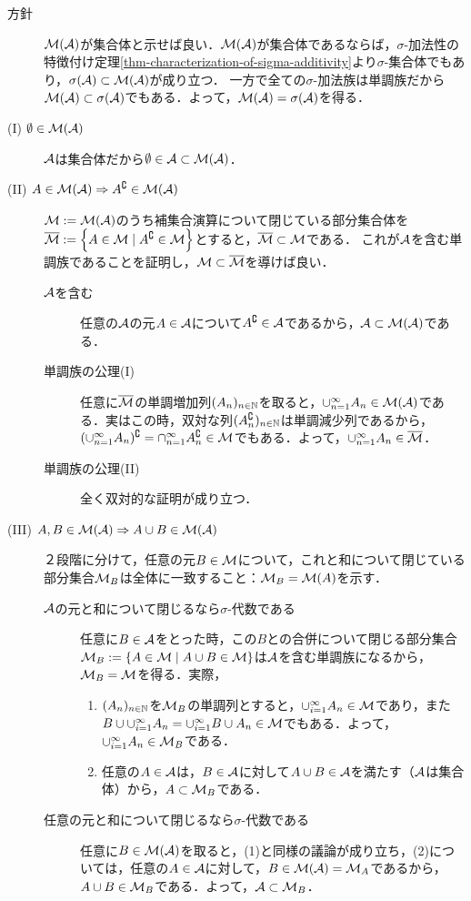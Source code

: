 \documentclass[uplatex, dvipdfmx]{jsreport}
\begin{document}
\begin{Proof}\mbox{}
    \begin{description}
        \item[方針] $\mathcal{M}(\mathcal{A})$が集合体と示せば良い．$\mathcal{M}(\mathcal{A})$が集合体であるならば，$\sigma$-加法性の特徴付け定理\ref{thm-characterization-of-sigma-additivity}より$\sigma$-集合体でもあり，$\sigma(\mathcal{A})\subset\mathcal{M}(\mathcal{A})$が成り立つ．
        一方で全ての$\sigma$-加法族は単調族だから$\mathcal{M}(\mathcal{A})\subset\sigma(\mathcal{A})$でもある．よって，$\mathcal{M}(\mathcal{A})=\sigma(\mathcal{A})$を得る．
        \item[(I) $\emptyset\in\mathcal{M}(\mathcal{A})$]
        $\mathcal{A}$は集合体だから$\emptyset\in\mathcal{A}\subset\mathcal{M}(\mathcal{A})$．
        \item[(II) $A\in\mathcal{M}(\mathcal{A})\Rightarrow A^\complement\in\mathcal{M}(\mathcal{A})$]
        $\mathcal{M}:=\mathcal{M}(\mathcal{A})$のうち補集合演算について閉じている部分集合体を$\overline{\mathcal{M}}:=\left\{A\in\mathcal{M}\mid A^\complement\in\mathcal{M}\right\}$とすると，$\overline{\mathcal{M}}\subset\mathcal{M}$である．
        これが$\mathcal{A}$を含む単調族であることを証明し，$\mathcal{M}\subset\overline{\mathcal{M}}$を導けば良い．
        \begin{description}
            \item[$\mathcal{A}$を含む] 任意の$\mathcal{A}$の元$A\in\mathcal{A}$について$A^\complement\in\mathcal{A}$であるから，$\mathcal{A}\subset\mathcal{M}(\mathcal{A})$である．
            \item[単調族の公理(I)] 任意に$\overline{\mathcal{M}}$の単調増加列$(A_n)_{n\in\mathbb{N}}$を取ると，$\cup^\infty_{n=1}A_n\in\mathcal{M}(\mathcal{A})$である．実はこの時，双対な列$(A_n^\complement)_{n\in\mathbb{N}}$は単調減少列であるから，$(\cup^\infty_{n=1}A_n)^\complement=\cap^\infty_{n=1}A_n^\complement\in\mathcal{M}$でもある．よって，$\cup^\infty_{n=1}A_n\in\overline{\mathcal{M}}$．
            \item[単調族の公理(II)] 全く双対的な証明が成り立つ．
        \end{description}
        \item[(III) $A,B\in\mathcal{M}(\mathcal{A})\Rightarrow A\cup B\in\mathcal{M}(\mathcal{A})$] ２段階に分けて，任意の元$B\in\mathcal{M}$について，これと和について閉じている部分集合$\mathcal{M}_B$は全体に一致すること：$\mathcal{M}_B=\mathcal{M}(A)$を示す．
            \begin{description}
                \item[$\mathcal{A}$の元と和について閉じるなら$\sigma$-代数である] 任意に$B\in\mathcal{A}$をとった時，この$B$との合併について閉じる部分集合$\mathcal{M}_B:=\left\{A\in\mathcal{M}\mid A\cup B\in\mathcal{M}\right\}$は$\mathcal{A}$を含む単調族になるから，$\mathcal{M}_B=\mathcal{M}$を得る．実際，
                \begin{enumerate}
                    \item $(A_n)_{n\in\mathbb{N}}$を$\mathcal{M}_B$の単調列とすると，$\cup_{i=1}^\infty A_n\in\mathcal{M}$であり，また$B\cup\cup_{i=1}^\infty A_n=\cup_{i=1}^\infty B\cup A_n\in\mathcal{M}$でもある．よって，$\cup_{i=1}^\infty A_n\in\mathcal{M}_B$である．
                    \item 任意の$A\in\mathcal{A}$は，$B\in\mathcal{A}$に対して$A\cup B\in\mathcal{A}$を満たす（$\mathcal{A}$は集合体）から，$A\subset\mathcal{M}_B$である．
                \end{enumerate}
                \item[任意の元と和について閉じるなら$\sigma$-代数である] 
                任意に$B\in\mathcal{M}(\mathcal{A})$を取ると，(1)と同様の議論が成り立ち，(2)については，任意の$A\in\mathcal{A}$に対して，$B\in \mathcal{M}(\mathcal{A})=\mathcal{M}_A$であるから，$A\cup B\in\mathcal{M}_B$である．よって，$\mathcal{A}\subset\mathcal{M}_B$．
            \end{description}
    \end{description}
\end{Proof}
\end{document}
